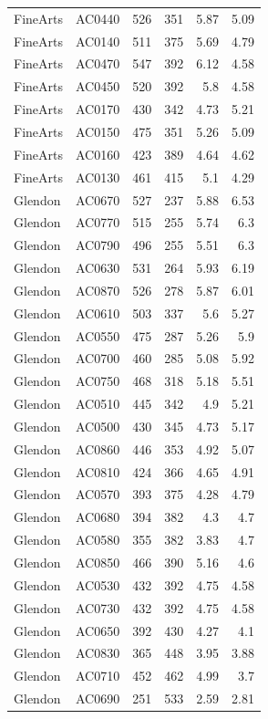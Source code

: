 \documentclass[article,10pt,microtype]{article}
\begin{document}
\begin{longtable}{llrrrr}
FineArts & AC0440 & 526 & 351 & 5.87 & 5.09\\
FineArts & AC0140 & 511 & 375 & 5.69 & 4.79\\
FineArts & AC0470 & 547 & 392 & 6.12 & 4.58\\
FineArts & AC0450 & 520 & 392 & 5.8 & 4.58\\
FineArts & AC0170 & 430 & 342 & 4.73 & 5.21\\
FineArts & AC0150 & 475 & 351 & 5.26 & 5.09\\
FineArts & AC0160 & 423 & 389 & 4.64 & 4.62\\
FineArts & AC0130 & 461 & 415 & 5.1 & 4.29\\
Glendon & AC0670 & 527 & 237 & 5.88 & 6.53\\
Glendon & AC0770 & 515 & 255 & 5.74 & 6.3\\
Glendon & AC0790 & 496 & 255 & 5.51 & 6.3\\
Glendon & AC0630 & 531 & 264 & 5.93 & 6.19\\
Glendon & AC0870 & 526 & 278 & 5.87 & 6.01\\
Glendon & AC0610 & 503 & 337 & 5.6 & 5.27\\
Glendon & AC0550 & 475 & 287 & 5.26 & 5.9\\
Glendon & AC0700 & 460 & 285 & 5.08 & 5.92\\
Glendon & AC0750 & 468 & 318 & 5.18 & 5.51\\
Glendon & AC0510 & 445 & 342 & 4.9 & 5.21\\
Glendon & AC0500 & 430 & 345 & 4.73 & 5.17\\
Glendon & AC0860 & 446 & 353 & 4.92 & 5.07\\
Glendon & AC0810 & 424 & 366 & 4.65 & 4.91\\
Glendon & AC0570 & 393 & 375 & 4.28 & 4.79\\
Glendon & AC0680 & 394 & 382 & 4.3 & 4.7\\
Glendon & AC0580 & 355 & 382 & 3.83 & 4.7\\
Glendon & AC0850 & 466 & 390 & 5.16 & 4.6\\
Glendon & AC0530 & 432 & 392 & 4.75 & 4.58\\
Glendon & AC0730 & 432 & 392 & 4.75 & 4.58\\
Glendon & AC0650 & 392 & 430 & 4.27 & 4.1\\
Glendon & AC0830 & 365 & 448 & 3.95 & 3.88\\
Glendon & AC0710 & 452 & 462 & 4.99 & 3.7\\
Glendon & AC0690 & 251 & 533 & 2.59 & 2.81\\

\end{longtable}
\end{document}
